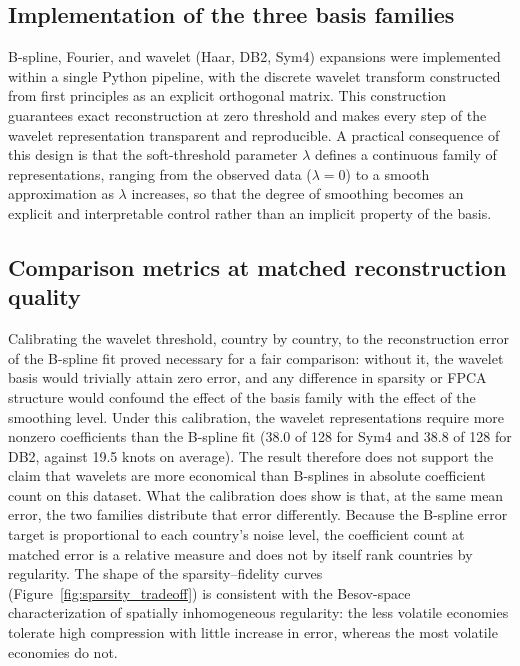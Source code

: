 \subsection{Implementation of the three basis families}

B-spline, Fourier, and wavelet (Haar, DB2, Sym4) expansions were
implemented within a single Python pipeline, with the discrete wavelet
transform constructed from first principles as an explicit orthogonal
matrix. This construction guarantees exact reconstruction at zero
threshold and makes every step of the wavelet representation
transparent and reproducible. A practical consequence of this design is
that the soft-threshold parameter $\lambda$ defines a continuous family
of representations, ranging from the observed data ($\lambda = 0$) to a
smooth approximation as $\lambda$ increases, so that the degree of
smoothing becomes an explicit and interpretable control rather than an
implicit property of the basis.

\subsection{Comparison metrics at matched reconstruction quality}

Calibrating the wavelet threshold, country by country, to the
reconstruction error of the B-spline fit proved necessary for a fair
comparison: without it, the wavelet basis would trivially attain zero
error, and any difference in sparsity or FPCA structure would confound
the effect of the basis family with the effect of the smoothing level.
Under this calibration, the wavelet representations require more
nonzero coefficients than the B-spline fit (38.0 of 128 for Sym4 and
38.8 of 128 for DB2, against 19.5 knots on average). The result
therefore does not support the claim that wavelets are more economical
than B-splines in absolute coefficient count on this dataset. What the
calibration does show is that, at the same mean error, the two families
distribute that error differently. Because the B-spline error target is
proportional to each country's noise level, the coefficient count at matched
error is a relative measure and does not by itself rank countries by
regularity. The
shape of the sparsity--fidelity curves (Figure~\ref{fig:sparsity_tradeoff})
is consistent with the Besov-space characterization of spatially
inhomogeneous regularity: the less volatile economies tolerate high
compression with little increase in error, whereas the most volatile
economies do not.

